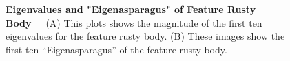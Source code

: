 \begin{figure}
    \centering
    \qquad
    \caption[First ten Eigenvalues and "Eigenasparagus" of Feature Rusty Body.]{\textbf{Eigenvalues and "Eigenasparagus" of Feature Rusty Body}~~~(A) This plots shows the magnitude of the first ten eigenvalues for the feature rusty body. (B) These images show the first ten “Eigenasparagus” of the feature rusty body.}
    \label{fig:PCArustybody}
\end{figure}

